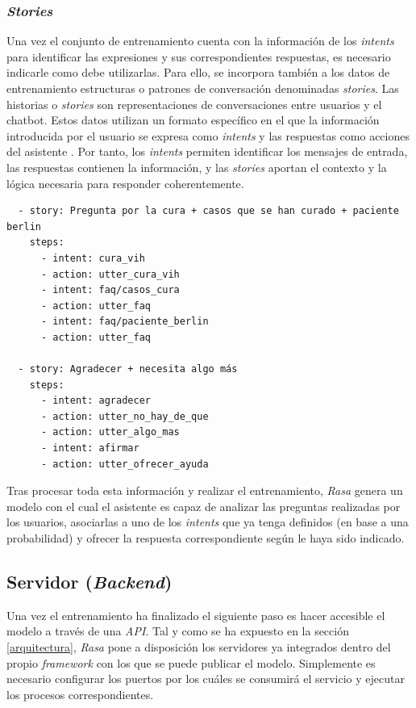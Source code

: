 \subsubsection{\textit{Stories}}
Una vez el conjunto de entrenamiento cuenta con la información de los \textit{intents} para identificar las expresiones y sus correspondientes respuestas, es necesario indicarle como debe utilizarlas. Para ello, se incorpora también a los datos de entrenamiento estructuras o patrones de conversación denominadas \textit{stories}. Las historias o \textit{stories} son representaciones de conversaciones entre usuarios y el chatbot. Estos datos utilizan un formato específico en el que la información introducida por el usuario se expresa como \textit{intents} y las respuestas como acciones del asistente \cite{rasaStories}. Por tanto, los \textit{intents} permiten identificar los mensajes de entrada, las respuestas contienen la información, y las \textit{stories} aportan el contexto y la lógica necesaria para responder coherentemente.\\

\begin{verbatim}
  - story: Pregunta por la cura + casos que se han curado + paciente berlin
    steps:
      - intent: cura_vih
      - action: utter_cura_vih
      - intent: faq/casos_cura
      - action: utter_faq
      - intent: faq/paciente_berlin
      - action: utter_faq

  - story: Agradecer + necesita algo más
    steps:
      - intent: agradecer
      - action: utter_no_hay_de_que
      - action: utter_algo_mas
      - intent: afirmar
      - action: utter_ofrecer_ayuda
\end{verbatim}


Tras procesar toda esta información y realizar el entrenamiento, \textit{Rasa} genera un modelo con el cual el asistente es capaz de analizar las preguntas realizadas por los usuarios, asociarlas a uno de los \textit{intents} que ya tenga definidos (en base a una probabilidad) y ofrecer la respuesta correspondiente según le haya sido indicado.\\

\subsection{Servidor (\textit{Backend})}
Una vez el entrenamiento ha finalizado el siguiente paso es hacer accesible el modelo a través de una \textit{API}. Tal y como se ha expuesto en la sección \ref{arquitectura}, \textit{Rasa} pone a disposición los servidores ya integrados dentro del propio \textit{framework} con los que se puede publicar el modelo. Simplemente es necesario configurar los puertos por los cuáles se consumirá el servicio y ejecutar los procesos correspondientes.

